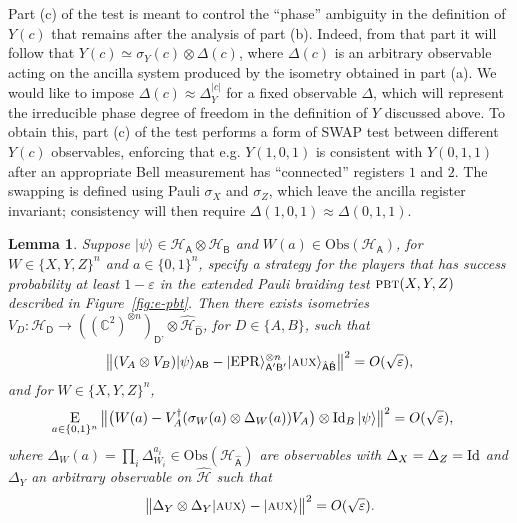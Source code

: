 \documentclass[11pt]{article}
\newtheorem{lemma}[theorem]{Lemma}
\theoremstyle{remark}
\theoremstyle{definition}
\newcommand{\ket}[1]{|#1\rangle}
\newcommand{\Id}{\ensuremath{\mathop{\rm Id}\nolimits}}
\newcommand{\Es}[1]{\ensuremath{\mathop{\textsc{E}}_{#1}}}
\newcommand{\reg}[1]{{\textsf{#1}}}
\newcommand{\C}{\ensuremath{\mathbb{C}}}
\newcommand{\mH}{\mathcal{H}}
\newcommand{\setft}[1]{\mathrm{#1}}
\newcommand{\Obs}{\setft{Obs}}
\newcommand{\eps}{\varepsilon}
\newcommand{\EPR}{{\rm EPR}}
\newcommand{\pbt}{\textsc{pbt}}
\newcommand{\aux}{\textsc {aux}}
\begin{document}
Part (c) of the test is meant to control the ``phase'' ambiguity in the definition of $Y(c)$ that remains after the analysis of part (b). Indeed, from that part it will follow that $Y(c) \simeq \sigma_Y(c) \otimes \Delta(c)$, where $\Delta(c)$ is an arbitrary observable acting on the ancilla system produced by the isometry obtained in part (a). We would like to impose $\Delta(c) \approx \Delta_Y^{|c|}$ for a fixed observable $\Delta$, which will represent the irreducible phase degree of freedom in the definition of $Y$ discussed above. To obtain this, part (c) of the test performs a form of SWAP test between different $Y(c)$ observables, enforcing that e.g. $Y(1,0,1)$ is consistent with $Y(0,1,1)$ after an appropriate Bell measurement has ``connected'' registers $1$ and $2$. The swapping is defined using Pauli $\sigma_X$ and $\sigma_Z$, which leave the ancilla register invariant; consistency will then require $\Delta(1,0,1) \approx \Delta(0,1,1)$.  

\begin{lemma}\label{lem:xyz-rigid}
Suppose $\ket{\psi}\in\mH_\reg{A}\otimes \mH_\reg{B}$ and $W(a) \in \Obs(\mH_\reg{A})$, for $W\in \{X,Y,Z\}^n$ and $a\in\{0,1\}^n$, specify a strategy for the players that has success probability at least $1-\eps$ in the extended Pauli braiding test $\pbt(X,Y,Z)$ described in Figure~\ref{fig:e-pbt}. 
Then there exists isometries $V_D:\mH_\reg{D} \to ((\C^2)^{\otimes n})_{\reg{D'}}  \otimes \hat{\mH}_{\hat{\reg{D}}}$, for $D\in\{A,B\}$, such that
$$\big\| (V_A \otimes V_B) \ket{\psi}_{\reg{AB}} - \ket{\EPR}_{\reg{A}'\reg{B}'}^{\otimes n} \ket{\aux}_{\hat{\reg{A}}\hat{\reg{B}}} \big\|^2 = O(\sqrt{\eps}),$$
and for $W\in \{X,Y,Z\}^n$,
\begin{align}\label{eq:test-sigmay}
 \Es{a\in\{0,1\}^n} \big\| \big(W(a) -V_A^\dagger (\sigma_W(a) \otimes \Delta_W(a)) V_A\big) \otimes \Id_B \ket{\psi} \big\|^2 &= O(\sqrt{\eps}),
\end{align}
where $\Delta_W(a) = \prod_i \Delta_{W_i}^{a_i} \in \Obs({\mH}_{\hat{\reg{A}}})$ are observables with $\Delta_{X}=\Delta_{Z}=\Id$ and $\Delta_{Y}$ an arbitrary observable on $\hat{\mH}$ such that
	$$ \big\|\Delta_Y \otimes \Delta_Y \ket{\aux} - \ket{\aux} \big\|^2 = O(\sqrt{\eps}).$$
\end{lemma}
\end{document}
